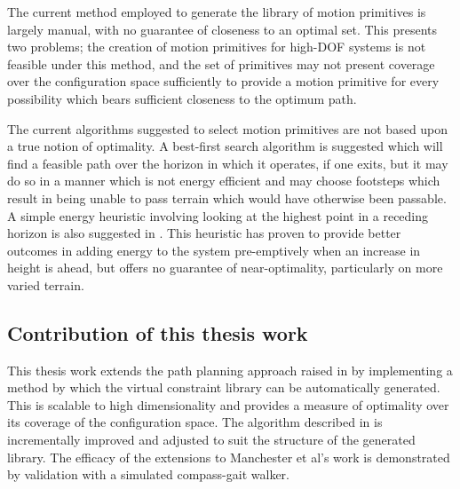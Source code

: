 The current method employed to generate the library of motion primitives is largely manual, with no guarantee of closeness to an optimal set. This presents two problems; the creation of motion primitives for high-DOF systems is not feasible under this method, and the set of primitives may not present coverage over the configuration space sufficiently to provide a motion primitive for every possibility which bears sufficient closeness to the optimum path. 

The current algorithms suggested to select motion primitives are not based upon a true notion of optimality. A best-first search algorithm is suggested which will find a feasible path over the horizon in which it operates, if one exits, but it may do so in a manner which is not energy efficient and may choose footsteps which result in being unable to pass terrain which would have otherwise been passable. A simple energy heuristic involving looking at the highest point in a receding horizon is also suggested in \cite{manchester13planning}. This heuristic has proven to provide better outcomes in adding energy to the system pre-emptively when an increase in height is ahead, but offers no guarantee of near-optimality, particularly on more varied terrain. 

\subsection{Contribution of this thesis work}
This thesis work extends the path planning approach raised in \cite{manchester13planning} by implementing a method by which the virtual constraint library can be automatically generated. This is scalable to high dimensionality and provides a measure of optimality over its coverage of the configuration space. The algorithm described in \cite{manchester13planning} is incrementally improved and adjusted to suit the structure of the generated library. The efficacy of the extensions to Manchester et al's work is demonstrated by validation with a simulated compass-gait walker.